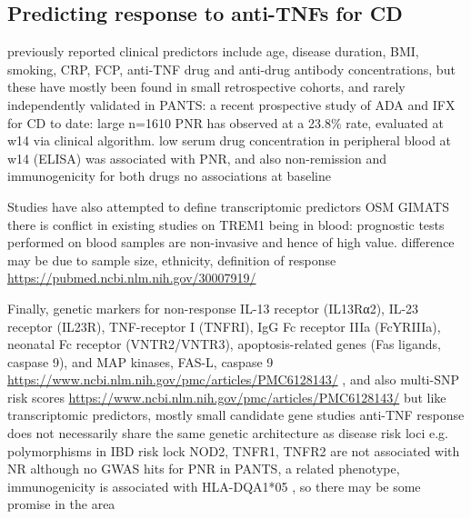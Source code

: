 \begin{outline}
\subsection{Predicting response to anti-TNFs for CD}

\1 previously reported clinical predictors include age, disease duration, BMI, smoking, CRP, FCP, anti-TNF drug and anti-drug antibody concentrations, but these have mostly been found in small retrospective cohorts, and rarely independently validated \autocite{ding2016SystematicReviewPredicting,kopylov2016PredictingDurableResponse,flamant2018InflammatoryBowelDisease,digby-bell2019InterrogatingHostImmunity,noor2020PersonalisedMedicineCrohn}
    \2 in PANTS: a recent prospective study of ADA and IFX for CD to date: large n=1610 \autocite{kennedy2019PredictorsAntiTNFTreatment}
    \2 PNR has observed at a 23.8\% rate, evaluated at w14 via clinical algorithm.
    \2 low serum drug concentration in peripheral blood at w14 (ELISA) was associated with PNR, and also non-remission and immunogenicity for both drugs
    \2 no associations at baseline

\1 Studies have also attempted to define transcriptomic predictors \autocite{digby-bell2019InterrogatingHostImmunity,noor2020PersonalisedMedicineCrohn}
    \2 OSM \autocite{west2017OncostatinDrivesIntestinal}
    \2 GIMATS \autocite{martin2019SingleCellAnalysisCrohn}
    \2 there is conflict in existing studies on TREM1
    \2 \autocite{verstockt2019LowTREM1Expression}
        \3 being in blood: prognostic tests performed on blood samples are non-invasive and hence of high value.
    \2 \autocite{gaujoux2019CellcentredMetaanalysisReveals}
    \2 difference may be due to sample size, ethnicity, definition of response \url{https://pubmed.ncbi.nlm.nih.gov/30007919/} \autocite{digby-bell2019InterrogatingHostImmunity}

\1 Finally, genetic markers for non-response \autocite{flamant2018InflammatoryBowelDisease}
    \2 IL-13 receptor (IL13Rα2), IL-23 receptor (IL23R), TNF-receptor I (TNFRI), IgG Fc receptor IIIa (FcYRIIIa), neonatal Fc receptor (VNTR2/VNTR3), apoptosis-related genes (Fas ligands, caspase 9), and MAP kinases, FAS-L, caspase 9 \url{https://www.ncbi.nlm.nih.gov/pmc/articles/PMC6128143/} \autocite{flamant2018InflammatoryBowelDisease}, and also multi-SNP risk scores \url{https://www.ncbi.nlm.nih.gov/pmc/articles/PMC6128143/}
    \2 but like transcriptomic predictors, mostly small candidate gene studies
    \2 anti-TNF response does not necessarily share the same genetic architecture as disease risk loci e.g. polymorphisms in IBD risk lock NOD2, TNFR1, TNFR2 are not associated with NR \autocite{digby-bell2019InterrogatingHostImmunity,noor2020PersonalisedMedicineCrohn}
    \2 although no GWAS hits for PNR in PANTS, a related phenotype, immunogenicity is associated with HLA-DQA1*05 \autocite{sazonovs2019HLADQA105Carriage}, so there may be some promise in the area


\end{outline}
